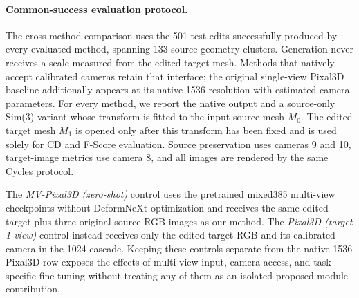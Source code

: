 \begin{appendix}
\paragraph{Common-success evaluation protocol.}
The cross-method comparison uses the 501 test edits successfully produced by
every evaluated method, spanning 133 source-geometry clusters.  Generation
never receives a scale measured from the edited target mesh.  Methods that
natively accept calibrated cameras retain that interface; the original
single-view Pixal3D baseline additionally appears at its native 1536
resolution with estimated camera parameters.  For every method, we report
the native output and a source-only Sim(3) variant whose transform is fitted
to the input source mesh $M_0$.  The edited target mesh $M_1$ is opened only
after this transform has been fixed and is used solely for CD and F-Score
evaluation.  Source preservation uses cameras 9 and 10, target-image metrics
use camera 8, and all images are rendered by the same Cycles protocol.

The \emph{MV-Pixal3D (zero-shot)} control uses the pretrained mixed385
multi-view checkpoints without DeformNeXt optimization and receives the same
edited target plus three original source RGB images as our method.  The
\emph{Pixal3D (target 1-view)} control instead receives only the edited target
RGB and its calibrated camera in the 1024 cascade.  Keeping these controls
separate from the native-1536 Pixal3D row exposes the effects of multi-view
input, camera access, and task-specific fine-tuning without treating any of
them as an isolated proposed-module contribution.













\end{appendix}
